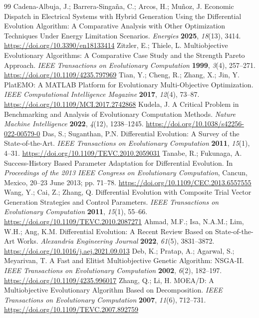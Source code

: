 \documentclass[energies,article,submit,moreauthors]{Definitions/mdpi}
\begin{document}
\begin{thebibliography}{99}
 Cadena-Albuja, J.; Barrera-Singa\~{n}a, C.; Arcos, H.; Mu\~{n}oz, J. Economic Dispatch in Electrical Systems with Hybrid Generation Using the Differential Evolution Algorithm: A Comparative Analysis with Other Optimization Techniques Under Energy Limitation Scenarios. \emph{Energies} \textbf{2025}, \emph{18}(13), 3414. \url{https://doi.org/10.3390/en18133414}
 Zitzler, E.; Thiele, L. Multiobjective Evolutionary Algorithms: A Comparative Case Study and the Strength Pareto Approach. \emph{IEEE Transactions on Evolutionary Computation} \textbf{1999}, \emph{3}(4), 257--271. \url{https://doi.org/10.1109/4235.797969}
 Tian, Y.; Cheng, R.; Zhang, X.; Jin, Y. PlatEMO: A MATLAB Platform for Evolutionary Multi-Objective Optimization. \emph{IEEE Computational Intelligence Magazine} \textbf{2017}, \emph{12}(4), 73--87. \url{https://doi.org/10.1109/MCI.2017.2742868}
 Kudela, J. A Critical Problem in Benchmarking and Analysis of Evolutionary Computation Methods. \emph{Nature Machine Intelligence} \textbf{2022}, \emph{4}(12), 1238--1245. \url{https://doi.org/10.1038/s42256-022-00579-0}
 Das, S.; Suganthan, P.N. Differential Evolution: A Survey of the State-of-the-Art. \emph{IEEE Transactions on Evolutionary Computation} \textbf{2011}, \emph{15}(1), 4--31. \url{https://doi.org/10.1109/TEVC.2010.2059031}
 Tanabe, R.; Fukunaga, A. Success-History Based Parameter Adaptation for Differential Evolution. In \emph{Proceedings of the 2013 IEEE Congress on Evolutionary Computation}, Cancun, Mexico, 20--23 June 2013; pp. 71--78. \url{https://doi.org/10.1109/CEC.2013.6557555}
 Wang, Y.; Cai, Z.; Zhang, Q. Differential Evolution with Composite Trial Vector Generation Strategies and Control Parameters. \emph{IEEE Transactions on Evolutionary Computation} \textbf{2011}, \emph{15}(1), 55--66. \url{https://doi.org/10.1109/TEVC.2010.2087271}
 Ahmad, M.F.; Isa, N.A.M.; Lim, W.H.; Ang, K.M. Differential Evolution: A Recent Review Based on State-of-the-Art Works. \emph{Alexandria Engineering Journal} \textbf{2022}, \emph{61}(5), 3831--3872. \url{https://doi.org/10.1016/j.aej.2021.09.013}
 Deb, K.; Pratap, A.; Agarwal, S.; Meyarivan, T. A Fast and Elitist Multiobjective Genetic Algorithm: NSGA-II. \emph{IEEE Transactions on Evolutionary Computation} \textbf{2002}, \emph{6}(2), 182--197. \url{https://doi.org/10.1109/4235.996017}
 Zhang, Q.; Li, H. MOEA/D: A Multiobjective Evolutionary Algorithm Based on Decomposition. \emph{IEEE Transactions on Evolutionary Computation} \textbf{2007}, \emph{11}(6), 712--731. \url{https://doi.org/10.1109/TEVC.2007.892759}

\end{thebibliography}
\end{document}
